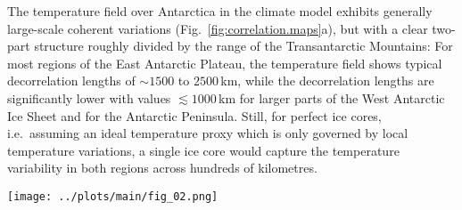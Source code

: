 \documentclass[cp, manuscript, draft]{copernicus}
\begin{document}
The temperature field over Antarctica in the climate model exhibits generally
large-scale coherent variations (Fig.~\ref{fig:correlation.maps}a), but with a
clear two-part structure roughly divided by the range of the Transantarctic
Mountains: For most regions of the East Antarctic Plateau, the temperature field
shows typical decorrelation lengths of $\sim1500$ to $2500$\,km, while the
decorrelation lengths are significantly lower with values $\lesssim1000$\,km for
larger parts of the West Antarctic Ice Sheet and for the Antarctic Peninsula.
Still, for perfect ice cores, i.e.\ assuming an ideal temperature proxy which is
only governed by local temperature variations, a single ice core would capture
the temperature variability in both regions across hundreds of kilometres.

\begin{figure*}[t]%
\centering
\texttt{[image: ../plots/main/fig\_02.png]}
\caption{%
  Temperature decorrelation lengths and temperature--isotope
  relationship. (\textbf{a}) The temperature decorrelation lengths ($\tau$, in
  km) for each Antarctic model grid cell estimated by fitting an exponential
  model to the correlation--distance relationship (cf. Eq.~\ref{eq:t2m.decorr})
  obtained from correlating the local annual near-surface $T_{2\mathrm{m}}$
  time series with the respective temperature time series from all other grid
  cells. Note that only continental grid cells are used for the fit.
  (\textbf{b}) The local correlation between the annual near-surface temperature
  ($T_{2\mathrm{m}}$) and precipitation-weighted oxygen isotope composition
  ($\delta^{18}\mathrm{O}^{\mathrm{(pw)}}$) time series for each Antarctic model
  grid cell.}
\label{fig:correlation.maps}%
\end{figure*}%
\end{document}

